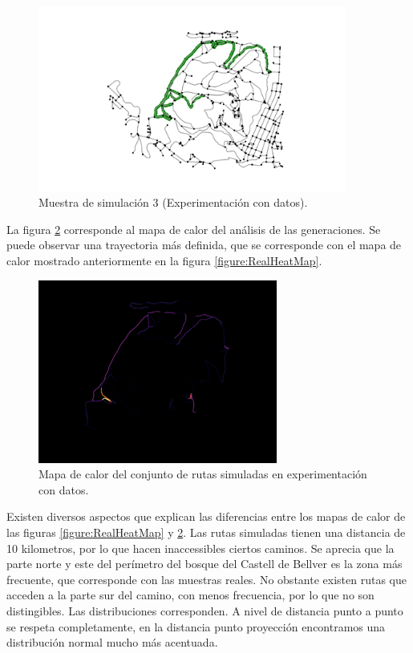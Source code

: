 \begin{figure}[!htb]
\begin{minipage}{0.48\textwidth}
\label{figure:SimulatedTrack2}
\end{minipage}
\hfill 
\begin{minipage}{0.48\textwidth}
\includegraphics[width=0.9\textwidth]{./Imagenes/SimulatedTrack3.png}
\caption{Muestra de simulación 3 (Experimentación con datos).}
\label{figure:SimulatedTrack3}
\end{minipage}
\end{figure}
\newpage

La figura \ref{figure:SimulatedHeatMap} corresponde al mapa de calor del análisis de las generaciones. Se puede observar una trayectoria más definida, que se corresponde con el mapa de calor mostrado 
anteriormente en la figura \ref{figure:RealHeatMap}.
\begin{figure}[!htb]
\begin{center}
\includegraphics[width=0.7\textwidth]{./Imagenes/SimulatedHeatMap1.png}
\caption{Mapa de calor del conjunto de rutas simuladas en experimentación con datos.}
\label{figure:SimulatedHeatMap}
\end{center}
\end{figure}
Existen diversos aspectos que explican las diferencias entre los mapas de calor de las figuras \ref{figure:RealHeatMap} y \ref{figure:SimulatedHeatMap}. Las rutas simuladas tienen una distancia de 
10 kilometros, por lo que hacen inaccessibles ciertos caminos. Se aprecia que la parte norte y este del 
perímetro del bosque del Castell de Bellver es la zona más frecuente, que corresponde con las muestras 
reales. No obstante existen rutas que acceden a la parte sur del camino, con menos frecuencia, por lo 
que no son distingibles.
Las distribuciones corresponden. A nivel de distancia punto a punto se respeta completamente, en la 
distancia punto proyección encontramos una distribución normal mucho más acentuada.

